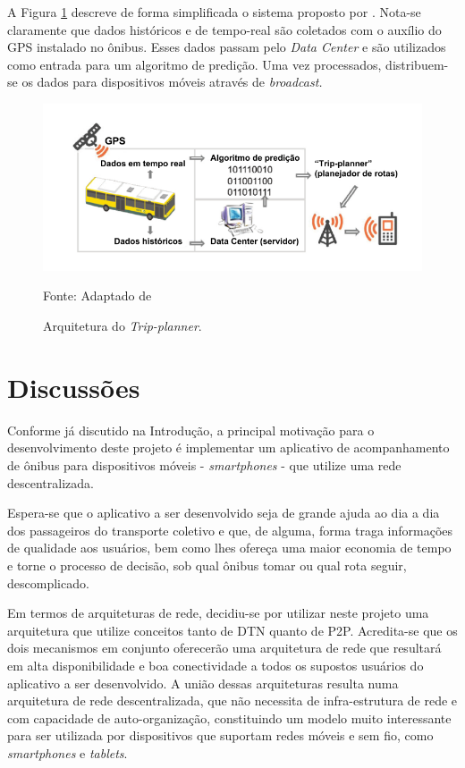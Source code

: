 \newpage

A Figura \ref{fig:archLisbon} descreve de forma simplificada o sistema proposto por . Nota-se claramente que dados históricos e de tempo-real são coletados com o auxílio do GPS instalado no ônibus. Esses dados passam pelo \emph{Data Center} e são utilizados como entrada para um algoritmo de predição. Uma vez processados, distribuem-se os dados para dispositivos móveis através de \emph{broadcast.}

\begin{figure}[h]
\begin{center}
    \includegraphics[width=0.85\columnwidth]{../figs/arquitetura_tripplanner.png}
    \caption{Arquitetura do \emph{Trip-planner}.}Fonte: Adaptado de \cite{alves}
    \label{fig:archLisbon}
\end{center}
\end{figure}

\section{Discussões}
Conforme já discutido na Introdução, a principal motivação para o desenvolvimento deste projeto é implementar um aplicativo de acompanhamento de ônibus para dispositivos móveis - \textit{smartphones} - que utilize uma rede descentralizada. 

Espera-se que o aplicativo a ser desenvolvido seja de grande ajuda ao dia a dia dos passageiros do transporte coletivo e que, de alguma, forma traga informações de qualidade aos usuários, bem como lhes ofereça uma maior economia de tempo e torne o processo de decisão, sob qual ônibus tomar ou qual rota seguir, descomplicado.

Em termos de arquiteturas de rede, decidiu-se por utilizar neste projeto uma arquitetura que utilize conceitos tanto de DTN quanto de P2P. Acredita-se que os dois mecanismos em conjunto oferecerão uma arquitetura de rede que resultará em alta disponibilidade e boa conectividade a todos os supostos usuários do aplicativo a ser desenvolvido. A união dessas arquiteturas resulta numa arquitetura de rede descentralizada, que não necessita de infra-estrutura de rede e com capacidade de auto-organização, constituindo um modelo muito interessante para ser utilizada por dispositivos que suportam redes móveis e sem fio, como \textit{smartphones} e \textit{tablets}.


